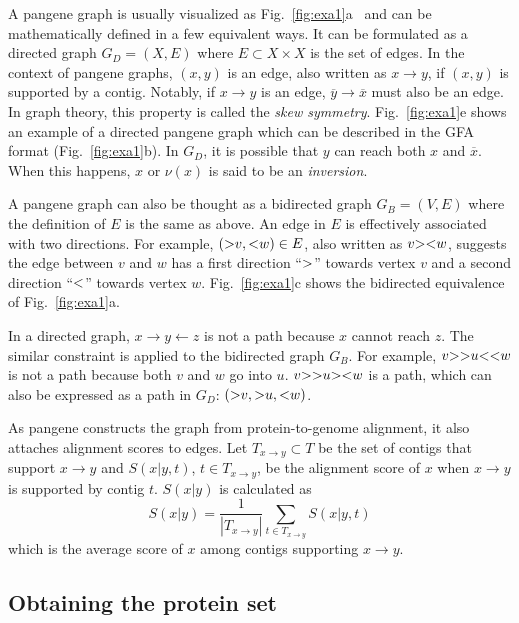\documentclass[webpdf,contemporary,large,namedate]{oup-authoring-template}%
\begin{document}
A pangene graph is usually visualized as Fig.~\ref{fig:exa1}a~\citep{Wick:2015qf}
and can be mathematically defined in a few equivalent ways.
It can be formulated as a directed graph $G_D=(X,E)$ where $E\subset X\times X$ is the set of edges.
In the context of pangene graphs, $(x,y)$ is an edge, also written as $x\to y$, if $(x,y)$ is supported by a contig.
Notably, if $x\to y$ is an edge, $\overline{y}\to\overline{x}$ must also be an edge.
In graph theory, this property is called the \emph{skew symmetry}.
Fig.~\ref{fig:exa1}e shows an example of a directed pangene graph
which can be described in the GFA format (Fig.~\ref{fig:exa1}b).
In $G_D$, it is possible that $y$ can reach both $x$ and $\overline{x}$.
When this happens, $x$ or $\nu(x)$ is said to be an \emph{inversion}.

A pangene graph can also be thought as a bidirected graph $G_B=(V,E)$ where the definition of $E$ is the same as above.
An edge in $E$ is effectively associated with two directions.
For example, $({\rm >}v,{\rm <}w)\in E$, also written as $v{\rm ><}w$,
suggests the edge between $v$ and $w$ has a first direction ``${\rm >}$'' towards vertex $v$ and a second direction ``${\rm <}$'' towards vertex $w$.
Fig.~\ref{fig:exa1}c shows the bidirected equivalence of Fig.~\ref{fig:exa1}a.

In a directed graph, $x\to y\gets z$ is not a path because $x$ cannot reach $z$.
The similar constraint is applied to the bidirected graph $G_B$.
For example, $v{\rm >>}u{\rm <<}w$ is not a path because both $v$ and $w$ go into $u$.
$v{\rm >>}u{\rm ><}w$ is a path, which can also be expressed as a path in $G_D$: $({\rm >}v,{\rm >}u,{\rm <}w)$.


As pangene constructs the graph from protein-to-genome alignment,
it also attaches alignment scores to edges.
Let $T_{x\to y}\subset T$ be the set of contigs that support $x\to y$
and $S(x|y,t)$, $t\in T_{x\to y}$, be the alignment score of $x$ when $x\to y$ is supported by contig $t$.
$S(x|y)$ is calculated as
$$
S(x|y)=\frac{1}{|T_{x\to y}|}\sum_{t\in T_{x\to y}}S(x|y,t)
$$
which is the average score of $x$ among contigs supporting $x\to y$.

\subsection{Obtaining the protein set}
\end{document}
